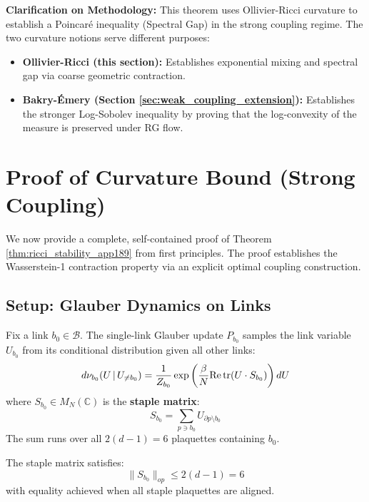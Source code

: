 \textbf{Clarification on Methodology:} This theorem uses Ollivier-Ricci curvature to establish a Poincaré inequality (Spectral Gap) in the strong coupling regime. The two curvature notions serve different purposes:
\begin{itemize}
    \item \textbf{Ollivier-Ricci (this section):} Establishes exponential mixing and spectral gap via coarse geometric contraction.
    \item \textbf{Bakry-Émery (Section \ref{sec:weak_coupling_extension}):} Establishes the stronger Log-Sobolev inequality by proving that the log-convexity of the measure is preserved under RG flow.
\end{itemize}

\section{Proof of Curvature Bound (Strong Coupling)}

We now provide a complete, self-contained proof of Theorem \ref{thm:ricci_stability_app189} from first principles. The proof establishes the Wasserstein-1 contraction property via an explicit optimal coupling construction.

\subsection{Setup: Glauber Dynamics on Links}

\begin{definition}
Fix a link $b_0 \in \mathcal{B}$. The single-link Glauber update $P_{b_0}$ samples the link variable $U_{b_0}$ from its conditional distribution given all other links:
\begin{equation}
    d\nu_{b_0}(U \,|\, U_{\neq b_0}) = \frac{1}{Z_{b_0}} \exp\left( \frac{\beta}{N} \text{Re\,tr}(U \cdot S_{b_0}) \right) dU
\end{equation}
where $S_{b_0} \in M_N(\mathbb{C})$ is the \textbf{staple matrix}:
\begin{equation}
    S_{b_0} = \sum_{p \ni b_0} U_{\partial p \setminus b_0}
\end{equation}
The sum runs over all $2(d-1) = 6$ plaquettes containing $b_0$.
\end{definition}

\begin{lemma}\label{lem:staple_bound}
The staple matrix satisfies:
\begin{equation}
    \|S_{b_0}\|_{op} \leq 2(d-1) = 6
\end{equation}
with equality achieved when all staple plaquettes are aligned.
\end{lemma}

